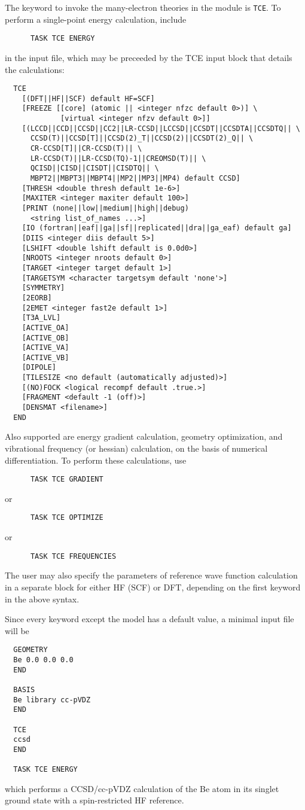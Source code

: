 The keyword to invoke the many-electron theories in the module is
\verb+TCE+.  To perform a single-point energy calculation, include
\begin{verbatim}
      TASK TCE ENERGY
\end{verbatim}
in the input file, which may be preceeded by the TCE input block
that details the calculations:
\begin{verbatim}
  TCE
    [(DFT||HF||SCF) default HF=SCF]
    [FREEZE [[core] (atomic || <integer nfzc default 0>)] \
             [virtual <integer nfzv default 0>]]
    [(LCCD||CCD||CCSD||CC2||LR-CCSD||LCCSD||CCSDT||CCSDTA||CCSDTQ|| \
      CCSD(T)||CCSD[T]||CCSD(2)_T||CCSD(2)||CCSDT(2)_Q|| \
      CR-CCSD[T]||CR-CCSD(T)|| \
      LR-CCSD(T)||LR-CCSD(TQ)-1||CREOMSD(T)|| \
      QCISD||CISD||CISDT||CISDTQ|| \
      MBPT2||MBPT3||MBPT4||MP2||MP3||MP4) default CCSD]
    [THRESH <double thresh default 1e-6>]
    [MAXITER <integer maxiter default 100>]
    [PRINT (none||low||medium||high||debug)
      <string list_of_names ...>]
    [IO (fortran||eaf||ga||sf||replicated||dra||ga_eaf) default ga]
    [DIIS <integer diis default 5>]
    [LSHIFT <double lshift default is 0.0d0>]
    [NROOTS <integer nroots default 0>]
    [TARGET <integer target default 1>]
    [TARGETSYM <character targetsym default 'none'>]
    [SYMMETRY]
    [2EORB]
    [2EMET <integer fast2e default 1>]
    [T3A_LVL] 
    [ACTIVE_OA]
    [ACTIVE_OB]
    [ACTIVE_VA]
    [ACTIVE_VB]
    [DIPOLE]
    [TILESIZE <no default (automatically adjusted)>]
    [(NO)FOCK <logical recompf default .true.>]
    [FRAGMENT <default -1 (off)>]
    [DENSMAT <filename>]
  END
\end{verbatim}
Also supported are energy gradient calculation, geometry optimization,
and vibrational frequency (or hessian) calculation, on the basis of
numerical differentiation.  To perform these calculations, use
\begin{verbatim}
      TASK TCE GRADIENT
\end{verbatim}
or
\begin{verbatim}
      TASK TCE OPTIMIZE
\end{verbatim}
or
\begin{verbatim}
      TASK TCE FREQUENCIES
\end{verbatim}

The user may also specify the parameters of reference wave function calculation
in a separate block for either HF (SCF) or DFT, depending on the first keyword
in the above syntax.

Since every keyword except the model has a default value, a minimal input file will be
\begin{verbatim}
  GEOMETRY
  Be 0.0 0.0 0.0
  END

  BASIS
  Be library cc-pVDZ
  END

  TCE
  ccsd
  END

  TASK TCE ENERGY
\end{verbatim}
which performs a CCSD/cc-pVDZ calculation of the Be atom in its
singlet ground state with a spin-restricted HF reference.

